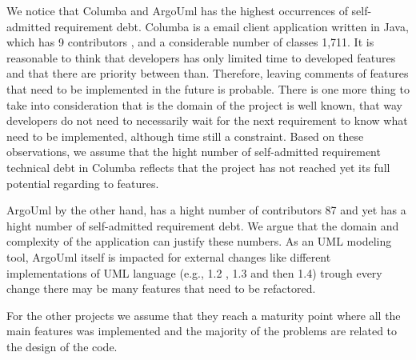 We notice that Columba and ArgoUml has the highest occurrences of self-admitted requirement debt. Columba is a email client application written in Java, which has 9 contributors \cite{Openhub:home}, and a considerable number of classes 1,711. It is reasonable to think that developers has only limited time to developed features and that there are priority between than. Therefore, leaving comments of features that need to be implemented in the future is probable. There is one more thing to take into consideration that is the domain of the project is well known, that way developers do not need to necessarily wait for the next requirement to know what need to be implemented, although time still a constraint. Based on these observations, we assume that the hight number of self-admitted requirement technical debt in Columba reflects that the project has not reached yet its full potential regarding to features. 

ArgoUml by the other hand, has a hight number of contributors 87 and yet has a hight number of self-admitted requirement debt. We argue that the domain and complexity of the application can justify these numbers. As an UML modeling tool, ArgoUml itself is impacted for external changes like different implementations of UML language (e.g., 1.2 , 1.3 and then 1.4) trough every change there may be many features that need to be refactored. 

For the other projects we assume that they reach a maturity point where all the main features was implemented and the majority of the problems are related to the design of the code. 
